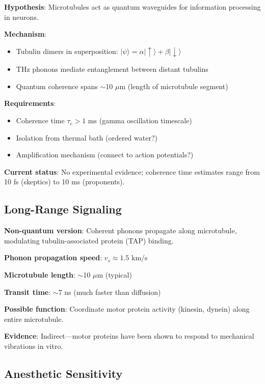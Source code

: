 \textbf{Hypothesis}: Microtubules act as quantum waveguides for information processing in neurons.

\textbf{Mechanism}:
\begin{itemize}
\item Tubulin dimers in superposition: $|\psi\rangle = \alpha|\uparrow\rangle + \beta|\downarrow\rangle$
\item THz phonons mediate entanglement between distant tubulins
\item Quantum coherence spans $\sim$10 $\mu$m (length of microtubule segment)
\end{itemize}

\textbf{Requirements}:
\begin{itemize}
\item Coherence time $\tau_c > 1$ ms (gamma oscillation timescale)
\item Isolation from thermal bath (ordered water?)
\item Amplification mechanism (connect to action potentials?)
\end{itemize}

\textbf{Current status}: No experimental evidence; coherence time estimates range from 10 fs (skeptics) to 10 ms (proponents).

\subsection{Long-Range Signaling}\label{long-range-signaling}

\textbf{Non-quantum version}: Coherent phonons propagate along microtubule, modulating tubulin-associated protein (TAP) binding.

\textbf{Phonon propagation speed}: $v_s \approx 1.5$ km/s

\textbf{Microtubule length}: $\sim$10 $\mu$m (typical)

\textbf{Transit time}: $\sim$7 ns (much faster than diffusion)

\textbf{Possible function}: Coordinate motor protein activity (kinesin, dynein) along entire microtubule.

\textbf{Evidence}: Indirect---motor proteins have been shown to respond to mechanical vibrations in vitro.

\subsection{Anesthetic Sensitivity}\label{anesthetic-sensitivity}

